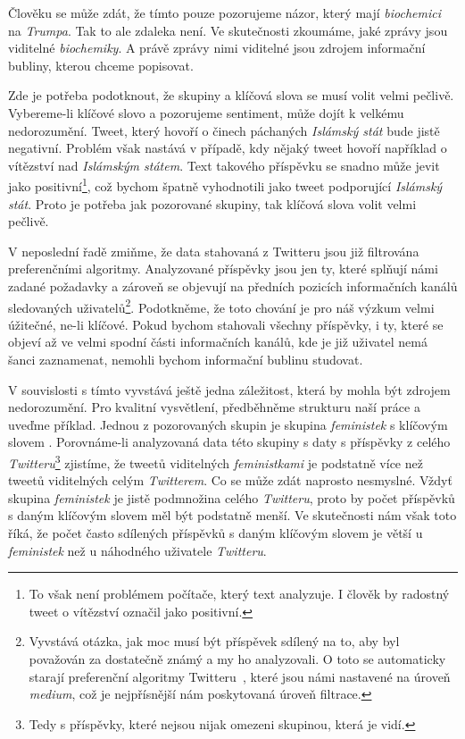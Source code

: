 \documentclass[12pt, a4paper]{article}
\numberwithin{equation}{section} 	%
\begin{document}
Člověku se může zdát, že tímto pouze pozorujeme názor, který mají \textit{biochemici} na \textit{Trumpa}. Tak to ale zdaleka není. Ve skutečnosti zkoumáme, jaké zprávy jsou viditelné \textit{biochemiky}. A právě zprávy nimi viditelné jsou zdrojem informační bubliny, kterou chceme popisovat.

Zde je potřeba podotknout, že skupiny a klíčová slova se musí volit velmi pečlivě. Vybereme-li klíčové slovo \textit{} a pozorujeme sentiment, může dojít k velkému nedorozumění. Tweet, který hovoří o činech páchaných \textit{Islámský stát} bude jistě negativní. Problém však nastává v případě, kdy nějaký tweet hovoří například o vítězství nad \textit{Islámským státem}. Text takového příspěvku se snadno může jevit jako positivní\footnote{To však není problémem počítače, který text analyzuje. I člověk by radostný tweet o vítězství označil jako positivní.}, což bychom špatně vyhodnotili jako tweet podporující \textit{Islámský stát}. Proto je potřeba jak pozorované skupiny, tak klíčová slova volit velmi pečlivě.

V neposlední řadě zmiňme, že data stahovaná z Twitteru jsou již filtrována preferenčními algoritmy. Analyzované příspěvky jsou jen ty, které splňují námi zadané požadavky a zároveň se objevují na předních pozicích informačních kanálů sledovaných uživatelů\footnote{Vyvstává otázka, jak moc musí být příspěvek sdílený na to, aby byl považován za dostatečně známý a my ho analyzovali. O toto se automaticky starají preferenční algoritmy Twitteru~\cite{twitterAPI}, které jsou námi nastavené na úroveň \textit{medium}, což je nejpřísnější nám poskytovaná úroveň filtrace.}. Podotkněme, že toto chování je pro náš výzkum velmi úžitečné, ne-li klíčové. Pokud bychom stahovali všechny příspěvky, i ty, které se objeví až ve velmi spodní části informačních kanálů, kde je již uživatel nemá šanci zaznamenat, nemohli bychom informační bublinu studovat.

V souvislosti s tímto vyvstává ještě jedna záležitost, která by mohla být zdrojem nedorozumění. Pro kvalitní vysvětlení, předběhněme strukturu naší práce a uveďme příklad. Jednou z pozorovaných skupin je skupina \textit{feministek} s klíčovým slovem \textit{}. Porovnáme-li analyzovaná data této skupiny s daty s příspěvky z celého \textit{Twitteru}\footnote{Tedy s příspěvky, které nejsou nijak omezeni skupinou, která je vidí.} zjistíme, že tweetů viditelných \textit{feministkami} je podstatně více než tweetů viditelných celým \textit{Twitterem}. Co se může zdát naprosto nesmyslné. Vždyť skupina \textit{feministek} je jistě podmnožina celého \textit{Twitteru}, proto by počet příspěvků s daným klíčovým slovem měl být podstatně menší. Ve skutečnosti nám však toto říká, že počet často sdílených příspěvků s daným klíčovým slovem je větší u \textit{feministek} než u náhodného uživatele \textit{Twitteru}.
\end{document}
